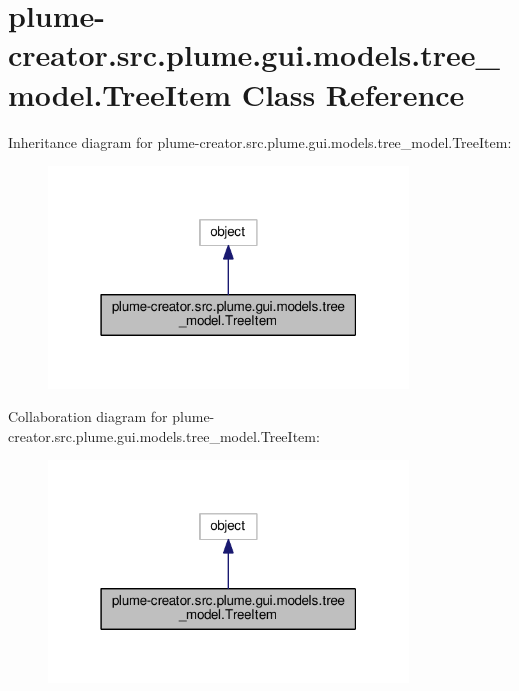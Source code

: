 \hypertarget{classplume-creator_1_1src_1_1plume_1_1gui_1_1models_1_1tree__model_1_1_tree_item}{}\section{plume-\/creator.src.\+plume.\+gui.\+models.\+tree\+\_\+model.\+Tree\+Item Class Reference}
\label{classplume-creator_1_1src_1_1plume_1_1gui_1_1models_1_1tree__model_1_1_tree_item}


Inheritance diagram for plume-\/creator.src.\+plume.\+gui.\+models.\+tree\+\_\+model.\+Tree\+Item\+:\nopagebreak
\begin{figure}[H]
\begin{center}
\leavevmode
\includegraphics[width=271pt]{classplume-creator_1_1src_1_1plume_1_1gui_1_1models_1_1tree__model_1_1_tree_item__inherit__graph}
\end{center}
\end{figure}


Collaboration diagram for plume-\/creator.src.\+plume.\+gui.\+models.\+tree\+\_\+model.\+Tree\+Item\+:\nopagebreak
\begin{figure}[H]
\begin{center}
\leavevmode
\includegraphics[width=271pt]{classplume-creator_1_1src_1_1plume_1_1gui_1_1models_1_1tree__model_1_1_tree_item__coll__graph}
\end{center}
\end{figure}
